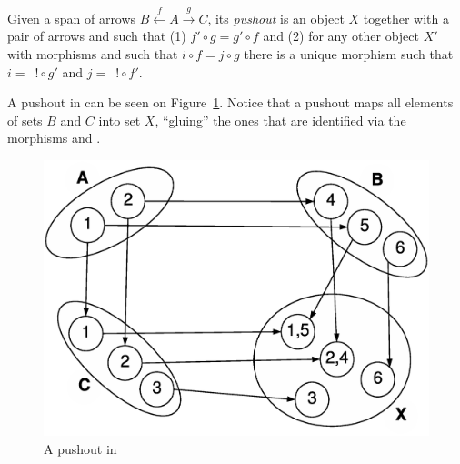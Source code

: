 \begin{definition}[Pushout] Given a span of arrows \mbox{$B \xleftarrow{f} A \xrightarrow{g} C$}, its \emph{pushout} is an object $X$ together with a pair of arrows  and  such that (1) \mbox{$f' \circ g = g' \circ f$} and (2) for any other object $X'$ with morphisms  and  such that $i \circ f = j \circ g$ there is a unique morphism  such that \mbox{$i =$ $! \circ g'$} and \mbox{$j =$ $! \circ f'$}.


\end{definition}

\begin{example} A pushout in  can be seen on Figure~\ref{fig:gts:pushout}. Notice that a pushout maps all elements of sets $B$ and $C$ into set $X$, ``gluing'' the ones that are identified via the morphisms  and .

\begin{figure}[!ht]
  \centering
  \includegraphics[scale=0.4]{images/gts/pushout}
  \caption{A pushout in }\label{fig:gts:pushout}
\end{figure}

\end{example}

